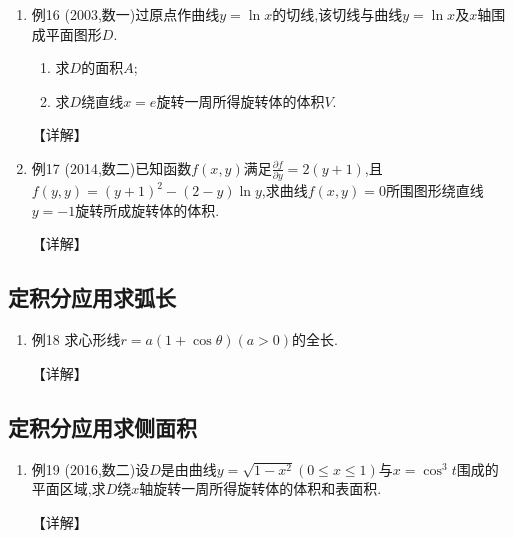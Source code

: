 \documentclass[12pt, a4paper, oneside, UTF8]{ctexbook}
\begin{document}
\begin{enumerate}[label=\arabic*.,start=15]
    \item 例16 (2003,数一)过原点作曲线$y=\ln x$的切线,该切线与曲线$y=\ln x$及$x$轴围成平面图形$D$.
    \begin{enumerate}[label=(\roman*)]
        \item 求$D$的面积$A$;
        \item 求$D$绕直线$x=e$旋转一周所得旋转体的体积$V$.
    \end{enumerate}
    
    \begin{solution}
    【详解】
    \end{solution}
    
    \item 例17 (2014,数二)已知函数$f(x, y)$满足$\frac{\partial f}{\partial y}=2(y+1)$,且$f(y, y)=(y+1)^2-(2-y)\ln y$,求曲线$f(x, y)=0$所围图形绕直线$y=-1$旋转所成旋转体的体积.
    
    \begin{solution}
    【详解】
    \end{solution}
\end{enumerate}

\subsection{ 定积分应用求弧长}

\begin{enumerate}[label=\arabic*.,start=17]
    \item 例18 求心形线$r=a(1+\cos\theta)(a>0)$的全长.
    
    \begin{solution}
    【详解】
    \end{solution}
\end{enumerate}

\subsection{ 定积分应用求侧面积}

\begin{enumerate}[label=\arabic*.,start=18]
    \item 例19 (2016,数二)设$D$是由曲线$y=\sqrt{1-x^2}(0\leq x\leq 1)$与$x=\cos^3 t$围成的平面区域,求$D$绕$x$轴旋转一周所得旋转体的体积和表面积.
    
    \begin{solution}
    【详解】
    \end{solution}
\end{enumerate}
\end{document}
